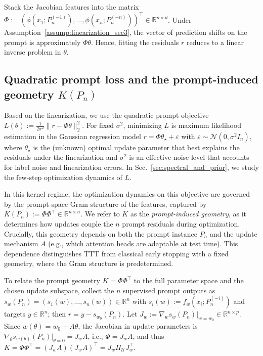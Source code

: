 \documentclass{article}
\theoremstyle{plain}
\theoremstyle{definition}
\theoremstyle{remark}
\begin{document}
Stack the Jacobian features into the matrix $\Phi := (\phi(x_1;P_n^{(-1)}),\ldots, \phi(x_n;P_n^{(-n)}))^{\top} \in \mathbb{R}^{n\times d}$. Under Assumption~\ref{assump:linearization_sec3}, the vector of prediction shifts on the prompt is approximately $\Phi\theta$. Hence, fitting the residuals $r$ reduces to a linear inverse problem in $\theta$.

\subsection{Quadratic prompt loss and the prompt-induced geometry $K(P_n)$}
\label{subsec:prompt_geometry_sec3}

Based on the linearization, we use the quadratic prompt objective $L(\theta):= \tfrac{1}{2\sigma^2}\|r-\Phi\theta\|_2^2$. For fixed $\sigma^2$, minimizing $L$ is maximum likelihood estimation in the Gaussian regression model $r = \Phi\theta_\star + \varepsilon$ with $\varepsilon\sim\mathcal{N}(0,\sigma^2 I_n)$, where $\theta_\star$ is the (unknown) optimal update parameter that best explains the residuals under the linearization and $\sigma^2$ is an effective noise level that accounts for label noise and linearization errors. In Sec.~\ref{sec:spectral_and_prior}, we study the few-step optimization dynamics of $L$.

In this kernel regime, the optimization dynamics on this objective are governed by the prompt-space Gram structure of the features, captured by $K(P_n) := \Phi\Phi^\top \in \mathbb{R}^{n\times n}$. We refer to $K$ as the \emph{prompt-induced geometry}, as it determines how updates couple the $n$ prompt residuals during optimization. Crucially, this geometry depends on both the prompt instance $P_n$ and the update mechanism $A$ (e.g., which attention heads are adaptable at test time). This dependence distinguishes TTT from classical early stopping with a fixed geometry, where the Gram structure is predetermined.

To relate the prompt geometry $K=\Phi\Phi^\top$ to the full parameter space and the chosen update subspace, collect the $n$ supervised prompt outputs as $s_w(P_n)=(s_1(w),\ldots,s_n(w))\in\mathbb{R}^n$ with $s_i(w):=f_w(x_i;P_n^{(-i)})$ and targets $y\in\mathbb{R}^n$; then $r= y-s_{w_0}(P_n)$. Let $J_w:=\nabla_w s_w(P_n)\big|_{w=w_0}\in\mathbb{R}^{n\times p}$. Since $w(\theta)=w_0+A\theta$, the Jacobian in update parameters is
$\nabla_\theta s_{w(\theta)}(P_n)\big|_{\theta=0}=J_wA$, i.e., $\Phi=J_wA$, and thus $K=\Phi\Phi^\top=(J_wA)(J_wA)^\top=J_w\Pi_{\mathcal{U}}J_w^\top$.
\end{document}

